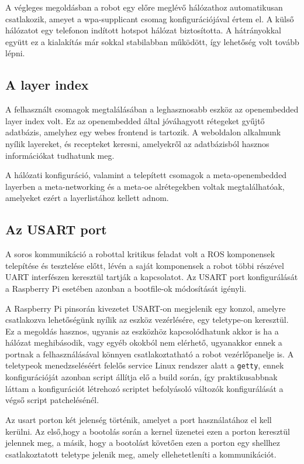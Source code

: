 \medskip

A végleges megoldásban a robot egy előre meglévő hálózathoz automatikusan
csatlakozik, ameyet a wpa-supplicant csomag konfigurációjával értem el. A külső
hálózatot egy telefonon indított hotspot hálózat biztosította. A hátrányokkal
együtt ez a kialakítás már sokkal stabilabban működött, így lehetőség volt tovább
lépni.

\medskip

\subsection{A layer index}

A felhasznált csomagok megtalálásában a leghasznosabb eszköz az
openembedded layer index volt. Ez az openembedded által jóváhagyott rétegeket
gyűjtő adatbázis, amelyhez egy webes frontend is tartozik. A weboldalon alkalmunk
nyílik layereket, és recepteket keresni, amelyekről az adatbázisból hasznos
információkat tudhatunk meg.

A hálózati konfiguráció, valamint a telepített csomagok a meta-openembedded
layerben a meta-networking és a meta-oe alrétegekben voltak megtalálhatóak,
amelyeket ezért a layerlistához kellett adnom.

\subsection{Az USART port}

A soros kommunikáció a robottal kritikus feladat volt a ROS komponensek
telepítése és tesztelése előtt, lévén a saját komponensek a robot többi részével
UART interfészen keresztül tartják a kapcsolatot. Az USART port konfigurálását a
Raspberry Pi esetében azonban a bootfile-ok módosítását igényli.

A Raspberry Pi pinsorán kivezetet USART-on megjelenik egy konzol, amelyre
csatlakozva lehetőségünk nyílik az eszköz vezérlésére, egy teletype-on
keresztül. Ez a megoldás hasznos, ugyanis az eszközhöz kapcsolódhatunk akkor is
ha a hálózat meghibásodik, vagy egyéb okokból nem elérhető, ugyanakkor ennek a
portnak a felhasználásával könnyen csatlakoztatható a robot vezérlőpanelje is.  A
teletypeok menedzseléséért felelős service Linux rendszer alatt a \verb|getty|,
ennek konfigurációját azonban script állítja elő a build során, így
praktikusabbnak láttam a konfigurációt létrehozó scriptet befolyásoló változók
konfigurálását a végső script patchelésénél.

Az usart porton két jelenség történik, amelyet a port használatához el kell
kerülni. Az első,hogy a bootolás során a kernel üzenetei ezen a porton keresztül
jelennek meg, a másik, hogy a bootolást követően ezen a porton egy shellhez
csatlakoztatott teletype jelenik meg, amely ellehetetleníti a kommunikációt.

